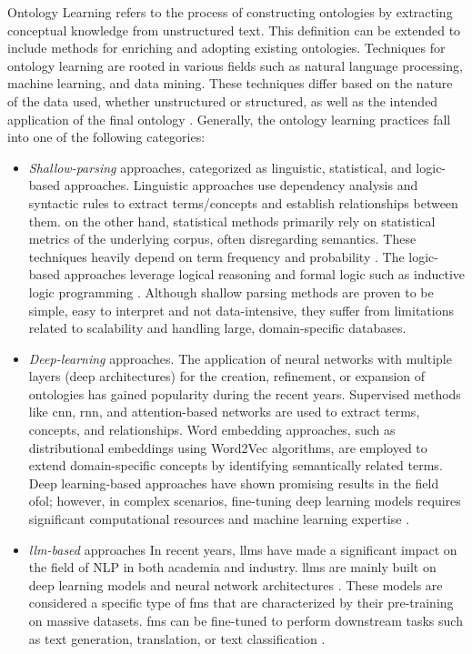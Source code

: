 Ontology Learning refers to the process of constructing ontologies by extracting conceptual knowledge from unstructured text. This definition can be extended to include methods for enriching and adopting existing ontologies. Techniques for ontology learning are rooted in various fields such as natural language processing, machine learning, and data mining. These techniques differ based on the nature of the data used, whether unstructured or structured, as well as the intended application of the final ontology \autocite{Watrobski2020}. 
Generally, the ontology learning practices fall into one of the following categories: 

\begin{itemize}
\item
\emph{Shallow-parsing} approaches, categorized as linguistic,
statistical, and logic-based approaches. Linguistic approaches use
dependency analysis and syntactic rules to extract terms/concepts and
establish relationships between them. on the other hand, statistical
methods primarily rely on statistical metrics of the underlying corpus,
often disregarding semantics. These techniques heavily depend on term
frequency and probability \autocite{Mellal2021}. The logic-based
approaches leverage logical reasoning and formal logic such as inductive
logic programming \autocite{Asim2018}. Although shallow parsing methods are proven to be simple, easy to interpret and not data-intensive, they suffer from limitations related to scalability and handling large, domain-specific databases.


\item
\emph{Deep-learning} approaches.
The application of neural networks with multiple layers (deep
architectures) for the creation, refinement, or expansion of ontologies
has gained popularity during the recent years. Supervised methods like
\gls{cnn}, \gls{rnn}, and attention-based networks are used to extract terms,
concepts, and relationships. Word embedding approaches, such as
distributional embeddings using Word2Vec algorithms, are employed to
extend domain-specific concepts by identifying semantically related
terms. Deep learning-based approaches have shown promising results in
the field of\gls{ol}; however, in complex scenarios,
fine-tuning deep learning models requires significant computational
resources and machine learning expertise \autocite{Du2024}.


\item
\emph{\gls{llm}-based} approaches
In recent years, \gls{llm}s have made a significant
impact on the field of NLP in both academia and industry. \gls{llm}s are
mainly built on deep learning models and neural network architectures
\autocite{Crum2024}. These models are considered a specific type of
\gls{fm}s that are characterized by their pre-training on
massive datasets. \gls{fm}s can be fine-tuned to perform downstream tasks such
as text generation, translation, or text classification \autocite{Perera2024}.


\end{itemize}
